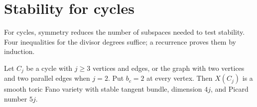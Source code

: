 \section{Stability for cycles}\label{sec:cycles}

For cycles, symmetry reduces the number of subspaces needed to test
stability. Four inequalities for the divisor degrees suffice; a recurrence
proves them by induction.

\begin{theorem}\label{cycle:stable}
Let $C_j$ be a cycle with $j\ge3$ vertices and edges, or the graph with
two vertices and two parallel edges when $j=2$. Put $b_c=2$ at every
vertex. Then $X(C_j)$ is a smooth toric Fano variety with stable tangent
bundle, dimension $4j$, and Picard number $5j$.
\end{theorem}

